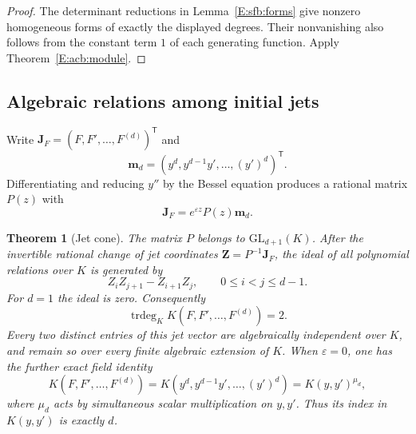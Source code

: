 \documentclass[11pt,a4paper]{article}
\newtheorem{theorem}{Theorem}[section]
\theoremstyle{definition}
\theoremstyle{remark}
\numberwithin{equation}{section}
\begin{document}
\begin{proof}
The determinant reductions in Lemma~\ref{E:sfb:forms} give nonzero homogeneous
forms of exactly the displayed degrees.  Their nonvanishing
also follows from the constant term $1$ of each generating
function.  Apply Theorem~\ref{E:acb:module}.
\end{proof}

\subsection{Algebraic relations among initial jets}

Write $\mathbf J_F=(F,F',\ldots,F^{(d)})^{\mathsf T}$ and
\[
 \mathbf m_d=(y^d,y^{d-1}y',\ldots,(y')^d)^{\mathsf T}.
\]
Differentiating and reducing $y''$ by the Bessel equation produces
a rational matrix $P(z)$ with
\begin{equation}\label{E:acb:jetgauge}
 \mathbf J_F=e^{\varepsilon z}P(z)\mathbf m_d.
\end{equation}

\begin{theorem}[Jet cone]\label{E:acb:jets}
The matrix $P$ belongs to $\mathrm{GL}_{d+1}(K)$.
After the invertible rational change of jet coordinates
$\mathbf Z=P^{-1}\mathbf J_F$, the ideal of all polynomial
relations over $K$ is generated by
\begin{equation}\label{E:acb:minors}
 Z_iZ_{j+1}-Z_{i+1}Z_j,
             \qquad 0\le i<j\le d-1.
\end{equation}
For $d=1$ the ideal is zero.  Consequently
\[
 \operatorname{trdeg}_{K}K(F,F',\ldots,F^{(d)})=2.
\]
Every two distinct entries of this jet vector are algebraically
independent over $K$, and remain so over every finite algebraic
extension of $K$.
When $\varepsilon=0$, one has the further exact field identity
\[
 K(F,F',\ldots,F^{(d)})
   =K(y^d,y^{d-1}y',\ldots,(y')^d)
   =K(y,y')^{\mu_d},
\]
where $\mu_d$ acts by simultaneous scalar multiplication on
$y,y'$.  Thus its index in $K(y,y')$ is exactly $d$.
\end{theorem}
\end{document}
